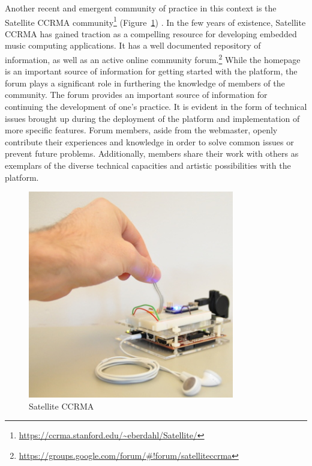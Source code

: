 Another recent and emergent community of practice in this context is the Satellite CCRMA community\footnote{\url{https://ccrma.stanford.edu/~eberdahl/Satellite/}} (Figure~\ref{Marquez-Borbon:fig:satellite}) \cite{Berdahl:2011}. In the few years of existence, Satellite CCRMA has gained traction as a compelling resource for developing embedded music computing applications. It has a well documented repository of information, as well as an active online community forum.\footnote{\url{https://groups.google.com/forum/\#!forum/satelliteccrma}} While the homepage is an important source of information for getting started with the platform, the forum plays a significant role in furthering the knowledge of members of the community. The forum provides an important source of information for continuing the development of one's practice. It is evident in the form of technical issues brought up during the deployment of the platform and implementation of more specific features. Forum members, aside from the webmaster, openly contribute their experiences and knowledge in order to solve common issues or prevent future problems. Additionally, members share their work with others as exemplars of the diverse technical capacities and artistic possibilities with the platform.

\begin{figure}[t]
	\centering
		\includegraphics[width=9cm]{sat1.jpg}
	\caption{Satellite CCRMA}
	\label{Marquez-Borbon:fig:satellite}
\end{figure}

